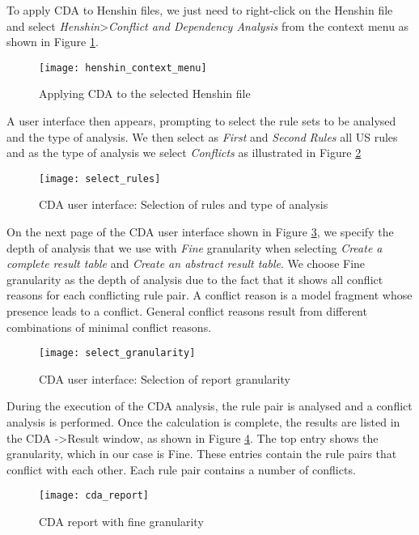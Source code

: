 To apply CDA to Henshin files, we just need to right-click on the Henshin file and select \textit{Henshin}\textgreater\textit{Conflict and Dependency Analysis} from the context menu as shown in Figure \ref{fig:henshin_context_menu}.
\begin{figure}[h]
	\center
	\texttt{[image: henshin\_context\_menu]}
	\caption{Applying CDA to the selected Henshin file}\label{fig:henshin_context_menu}
\end{figure}
A user interface then appears, prompting to select the rule sets to be analysed and the type of analysis. We then select as \textit{First} and \textit{Second} \textit{Rules} all US rules and as the type of analysis we select \textit{Conflicts} as illustrated in Figure \ref{fig:select_rules}
\begin{figure}[h]
	\center
	\texttt{[image: select\_rules]}
	\caption{CDA user interface: Selection of rules and type of analysis}\label{fig:select_rules}
\end{figure}
 On the next page of the CDA user interface shown in Figure \ref{fig:select_granularity}, we specify the depth of analysis that we use with \textit{Fine} granularity when selecting \textit{Create a complete result table} and \textit{Create an abstract result table}. We choose Fine granularity as the depth of analysis due to the fact that it shows all conflict reasons for each conflicting rule pair. A conflict reason is a model fragment whose presence leads to a conflict. General conflict reasons result from different combinations of minimal conflict reasons\cite{cda_api}.
 \begin{figure}[h]
 	\center
 	\texttt{[image: select\_granularity]}
 	\caption{CDA user interface: Selection of report granularity}\label{fig:select_granularity}
 \end{figure}
 
 During the execution of the CDA analysis, the rule pair is analysed and a conflict analysis is performed. Once the calculation is complete, the results are listed in the CDA -\textgreater Result window, as shown in Figure \ref{fig:cda_report}. The top entry shows the granularity, which in our case is Fine. These entries contain the rule pairs that conflict with each other. Each rule pair contains a number of conflicts.
  \begin{figure}[h]
 	\center
 	\texttt{[image: cda\_report]}
 	\caption{CDA report with fine granularity}\label{fig:cda_report}
 \end{figure}
 

